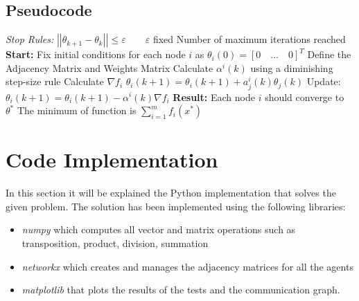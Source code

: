 \documentclass[a4paper,11pt,oneside]{book}
\begin{document}
\subsection {Pseudocode} \label{Subsec1.1.3}
\begin{algorithm}
\caption{}
\begin{algorithmic} [1]
\State \textit{Stop Rules:}
\State $\left|\left|\theta_{k+1} - \theta_k\right|\right|  \leq \varepsilon \qquad \varepsilon$ fixed
\State Number of maximum iterations reached
\State \textbf{Start:}
\State Fix initial conditions for each node $i$ as $\theta_i(0) = [0 \quad ... \quad 0]^T$
\State Define the Adjacency Matrix and Weights Matrix
	\State Calculate $\alpha^i(k)$ using a diminishing step-size rule
    \State Calculate $\nabla f_i$
        \State $\theta_i(k+1) = \theta_i(k+1) + a^i_j(k) \theta_j(k)$
    \EndFor
    \State Update: $\theta_i(k+1) = \theta_i(k+1) - \alpha^i(k) \nabla f_i$
\EndWhile
\State \textbf{Result:}
\State Each node $i$ should converge to $\theta^*$
\State The minimum of function is $\sum \limits_{i=1}^{m}f_i(x^*)$
\end{algorithmic}
\end{algorithm}


\section {Code Implementation} \label{Sec1.2}

In this section it will be explained the Python implementation that solves the given problem. The solution has been implemented using the following libraries:
\begin{itemize}
	\item  \textit{numpy} which computes all vector and matrix operations such as transposition, product, division,
	summation
	\item \textit{networkx} which creates and manages the adjacency matrices for all the agents
	\item \textit{matplotlib} that plots the results
	of the tests and the communication graph.
\end{itemize}
\end{document}
